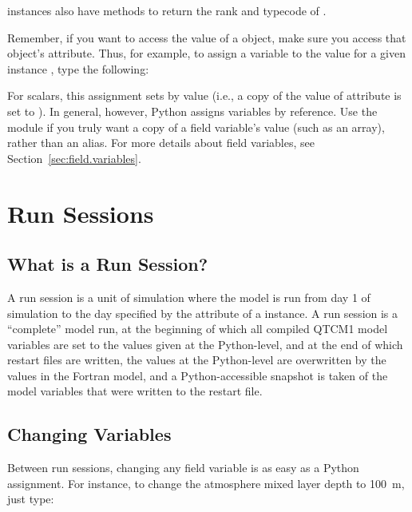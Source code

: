  instances also have methods to return the rank 
and typecode of .

Remember, if you want to access the value of a  object,
make sure you access that object's  attribute.  
Thus, for example,
to assign a variable  to the
 value for a given
 instance , type the following:
\begin{codeblock}
\end{codeblock}

For scalars, this assignment sets  by value (i.e., a copy
of the value of attribute  is set to ).
In general, however, Python assigns variables by reference.  Use
the  module if you truly want a copy of a field variable's
value (such as an array), rather than an alias.  For more details
about field variables, see Section~\ref{sec:field.variables}.




\section{Run Sessions}

	\subsection{What is a Run Session?}

A run session is a unit of simulation where the model is run from
day 1 of simulation to the day specified by the 
attribute of a  instance.  A run session is a
``complete'' model run, at the beginning of which all compiled QTCM1
model variables are set to the values given at the Python-level,
and at the end of which restart files are written, the values
at the Python-level are overwritten by the values in the Fortran
model, and a Python-accessible snapshot is taken of the 
model variables that were written to the restart file.


	\subsection{Changing Variables}

Between run sessions, changing any field variable is as easy
as a Python assignment.  For instance, to change the atmosphere
mixed layer depth to 100~m, just type:
\begin{codeblock}
\end{codeblock}

